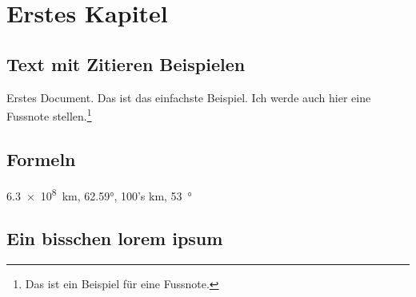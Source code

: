 
\section{Erstes Kapitel}
\subsection{Text mit Zitieren Beispielen}

Erstes Document. \cite{Lamport1986} Das ist das einfachste Beispiel. Ich werde auch hier eine Fussnote stellen.\footnote[1]{Das ist ein Beispiel für eine Fussnote.} 

\subsection{Formeln}
\SI{6.3e8}{km}, \ang{62.59}, \num{100}'s \si{km}, \SI{53}{\degree}

\subsection{Ein bisschen lorem ipsum}
\lipsum[1]